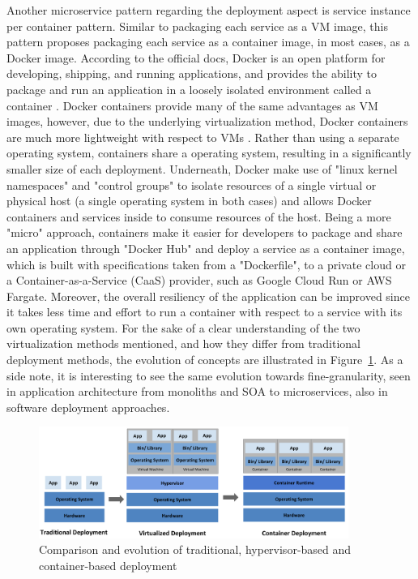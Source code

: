 \documentclass{Configuration_Files/PoliMi3i_thesis}
\begin{document}
Another microservice pattern regarding the deployment aspect is service instance per container pattern.
Similar to packaging each service as a VM image, this pattern proposes packaging each service as a container image, in most cases, as a Docker image.
According to the official docs, Docker is an open platform for developing, shipping, and running applications, and provides the ability to package and run an application in a loosely isolated environment called a container \cite{docker_def}.
Docker containers provide many of the same advantages as VM images, however, due to the underlying virtualization method, Docker containers are much more lightweight with respect to VMs \cite{eder2016hypervisor}.
Rather than using a separate operating system, containers share a operating system, resulting in a significantly smaller size of each deployment.
Underneath, Docker make use of "linux kernel namespaces" and "control groups" to isolate resources of a single virtual or physical host (a single operating system in both cases) and allows Docker containers and services inside to consume resources of the host.
Being a more "micro" approach, containers make it easier for developers to package and share an application through "Docker Hub" and deploy a service as a container image, which is built with specifications taken from a "Dockerfile", to a private cloud or a Container-as-a-Service (CaaS) provider, such as Google Cloud Run or AWS Fargate.
Moreover, the overall resiliency of the application can be improved since it takes less time and effort to run a container with respect to a service with its own operating system.
For the sake of a clear understanding of the two virtualization methods mentioned, and how they differ from traditional deployment methods, the evolution of concepts are illustrated in Figure~\ref{fig:hypervisor_vs_container}. As a side note, it is interesting to see the same evolution towards fine-granularity, seen in application architecture from monoliths and SOA to microservices, also in software deployment approaches.

\begin{figure}[H]
\centering
\includegraphics[width=0.90\textwidth]{myImages/kubernetes_evo.png}
\caption{Comparison and evolution of traditional, hypervisor-based and container-based deployment}
\label{fig:hypervisor_vs_container}
\end{figure}
\end{document}
